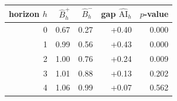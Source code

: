 \begin{tabular}{rrrrr}
\toprule
horizon $h$ & $\hat B^{+}_h$ & $\hat B^{-}_h$ & gap $\hat{\mathrm{AI}}_h$ & $p$-value \\
\midrule
0 & 0.67 & 0.27 & +0.40 & 0.000 \\
1 & 0.99 & 0.56 & +0.43 & 0.000 \\
2 & 1.00 & 0.76 & +0.24 & 0.009 \\
3 & 1.01 & 0.88 & +0.13 & 0.202 \\
4 & 1.06 & 0.99 & +0.07 & 0.562 \\
\bottomrule
\end{tabular}